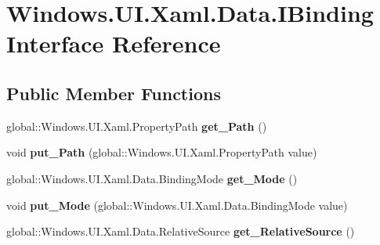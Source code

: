 \hypertarget{interface_windows_1_1_u_i_1_1_xaml_1_1_data_1_1_i_binding}{}\section{Windows.\+U\+I.\+Xaml.\+Data.\+I\+Binding Interface Reference}
\label{interface_windows_1_1_u_i_1_1_xaml_1_1_data_1_1_i_binding}
\subsection*{Public Member Functions}
\begin{DoxyCompactItemize}
\item 
\mbox{\label{interface_windows_1_1_u_i_1_1_xaml_1_1_data_1_1_i_binding_a9ca632846713b560304c9843f74ed7a8}} 
global\+::\+Windows.\+U\+I.\+Xaml.\+Property\+Path {\bfseries get\+\_\+\+Path} ()
\item 
\mbox{\label{interface_windows_1_1_u_i_1_1_xaml_1_1_data_1_1_i_binding_a196462b99c9682d263adef2e1bbefa09}} 
void {\bfseries put\+\_\+\+Path} (global\+::\+Windows.\+U\+I.\+Xaml.\+Property\+Path value)
\item 
\mbox{\label{interface_windows_1_1_u_i_1_1_xaml_1_1_data_1_1_i_binding_a0b5420b11dcee1ba04cc22736c406538}} 
global\+::\+Windows.\+U\+I.\+Xaml.\+Data.\+Binding\+Mode {\bfseries get\+\_\+\+Mode} ()
\item 
\mbox{\label{interface_windows_1_1_u_i_1_1_xaml_1_1_data_1_1_i_binding_a1677010e1baf985a2a7cb5a399ca34a8}} 
void {\bfseries put\+\_\+\+Mode} (global\+::\+Windows.\+U\+I.\+Xaml.\+Data.\+Binding\+Mode value)
\item 
\mbox{\label{interface_windows_1_1_u_i_1_1_xaml_1_1_data_1_1_i_binding_ae412c463e60fc889a9838767ab62109a}} 
global\+::\+Windows.\+U\+I.\+Xaml.\+Data.\+Relative\+Source {\bfseries get\+\_\+\+Relative\+Source} ()
\item 
\mbox{\label{interface_windows_1_1_u_i_1_1_xaml_1_1_data_1_1_i_binding_ae29a2f22aa4de72a0e7619934ac6e60a}} 

\end{DoxyCompactItemize}
